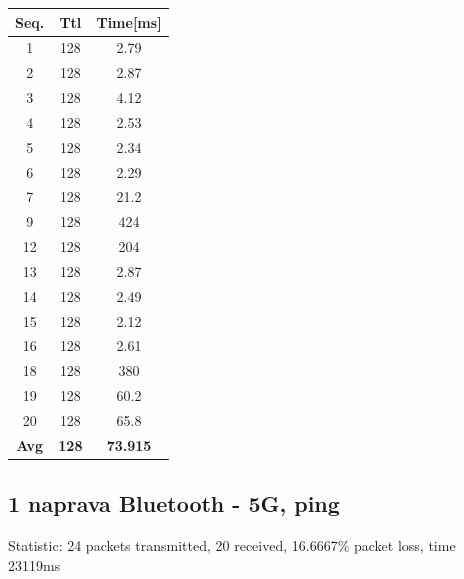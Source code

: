 \documentclass[11pt,a4paper,slovene]{article}
\begin{document}
 
\begin{table}[H]
	\begin{adjustwidth}{-3cm}{-3cm}
	\centering
		\begin{tabular}{c|c|c}
		\hline
		\textbf{Seq.} & \textbf{Ttl} & \textbf{Time[ms]}\\
     	\hline
     	1 & 128 & 2.79\\
  		2 & 128 & 2.87\\
  		3 & 128 & 4.12\\
  		4 & 128 & 2.53\\
  		5 & 128 & 2.34\\
  		6 & 128 & 2.29\\
  		7 & 128 & 21.2\\
  		9 & 128 & 424\\
  		12 & 128 & 204\\
  		13 & 128 & 2.87\\
  		14 & 128 & 2.49\\
  		15 & 128 & 2.12\\
  		16 & 128 & 2.61\\
  		18 & 128 & 380\\
  		19 & 128 & 60.2\\
  		20 & 128 & 65.8\\
  		\hline
  		\textbf{Avg} & \textbf{128} & \textbf{73.915}\\
  		\hline
  		\end{tabular}
    	\end{adjustwidth}
\end{table}


\subsection{1 naprava Bluetooth - 5G, ping}

Statistic: 24 packets transmitted, 20 received, 16.6667\% packet loss, time 23119ms
 
\end{document}
